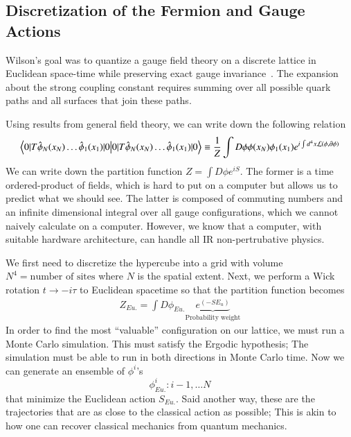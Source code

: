 \subsection{Discretization of the Fermion and Gauge Actions}
Wilson's goal was to quantize a gauge field theory on a discrete lattice in Euclidean space-time while preserving exact gauge invariance~\cite{Wilson:1974sk}. The expansion about the strong coupling constant requires summing over all possible quark paths and all surfaces that join these paths.  

Using results from general field theory, we can write down the following relation 
\begin{align}
    \braket{0|T{\hat{\phi}_N(x_N)\dots \hat{\phi}_1}(x_1)|0} \equiv\frac{1}{Z} \int D\phi\phi(x_N)\phi_1(x_1)e^{i\int d^4x\mathcal{L}(\phi,\partial\phi)}
\end{align}
We can write down the partition function $Z = \int D\phi e^{iS}$. 
The former is a time ordered-product of fields, which is hard to put on a computer but allows us to predict what we should see. The latter is composed of commuting numbers and an infinite dimensional integral over all gauge configurations, which we cannot naively calculate on a computer. However, we know that a computer, with suitable hardware architecture, can handle all IR non-pertrubative physics.   

We first need to discretize the hypercube into a grid with volume $N^4 = \text{number of sites}$ where $N$ is the spatial extent. Next, we perform a Wick rotation $t\rightarrow -i\tau$ to Euclidean spacetime so that the partition function becomes 
\begin{align}
    Z_{Eu.} = \int D\phi_{Eu.}\underbrace{e^{(-SE_u)}}_\text{Probability weight} 
\end{align} 
In order to find the most ``valuable'' configuration on our lattice, we must run a Monte Carlo simulation. This must satisfy the Ergodic hypothesis; The simulation must be able to run in both directions in Monte Carlo time. Now we can generate an ensemble of $\phi^i$'s 
\begin{equation}
    {\phi_{Eu.}^i: i-1,\dots N} 
\end{equation} that minimize the Euclidean action $S_{Eu.}$. Said another way, these are the trajectories that are as close to the classical action as possible; This is akin to how one can recover classical mechanics from quantum mechanics. 

